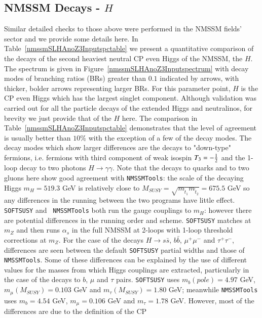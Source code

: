 \documentclass[final,3p,times]{elsarticle}
\begin{document}
\subsection{NMSSM Decays - $H$}

Similar detailed checks to those above were performed in the NMSSM fields'
sector and 
we provide some 
details here. In Table~\ref{nmssmSLHAnoZ3Inputspctable} we
present a quantitative comparison of the decays of the second heaviest neutral
CP 
even Higgs of the NMSSM, the $H$. The spectrum is given in
Figure~\ref{nmssmSLHAnoZ3Inputspectrum} with decay modes of branching ratios
(BRs) greater than $0.1$ indicated by arrows, with thicker, bolder arrows
representing larger BRs. For this parameter point, $H$ is the CP even Higgs
which has the largest singlet component. Although validation was carried out
for all the 
particle decays of 
the extended Higgs and neutralinos, for brevity we just provide that of the
$H$ here. 
The comparison in Table~\ref{nmssmSLHAnoZ3Inputspctable} demonstrates that the
level of 
agreement is usually better than $10\%$ with the
exception of a few of the decay modes. The decay modes which show larger
differences are the decays to "down-type" fermions, i.e. fermions with third
component of weak isospin $T_3 = -{1 \over 2}$ and the 1-loop decay to two
photons $H \rightarrow \gamma \gamma$. 
Note that the decays to quarks and to two
gluons here show good agreement with {\tt NMSSMTools}: the scale of the
decaying 
Higgs $m_H = 519.3$ GeV is relatively close to $M_{SUSY} =
\sqrt{m_{\tilde{t}_1}m_{\tilde{t}_2}} = 675.5$ GeV so any differences in the
running between the two programs have little effect. 
{\tt SOFTSUSY} and {\tt
  NMSSMTools} both run the gauge couplings to $m_H$: however there are
potential differences in the running order and 
scheme. {\tt SOFTSUSY} matches at $m_Z$ and then runs $\alpha_s$ in the full
NMSSM at 2-loops with 1-loop threshold corrections at $m_Z$. 
For the case of
the decays $H \rightarrow s \bar{s}$, $b \bar{b}$, $\mu^+ \mu^-$ and $\tau^+
\tau^-$, differences are seen between the default {\tt SOFTSUSY} 
partial widths and those of {\tt NMSSMTools}. Some of these differences can be
explained by the use of different values for the masses from which Higgs
couplings are extracted, particularly in the case
of the decays to $b$, $\mu$ 
and $\tau$ pairs. {\tt SOFTSUSY} uses $m_b(pole) = 4.97$ GeV, $m_{\mu}(M_{SUSY}) =
0.103$ GeV and $m_{\tau}(M_{SUSY}) = 1.80$ GeV; meanwhile {\tt NMSSMTools} uses
$m_b = 4.54$ GeV, $m_{\mu} = 0.106$ GeV and $m_{\tau} = 1.78$ GeV. However,
most of the differences are due to the definition of the CP 
\end{document}

